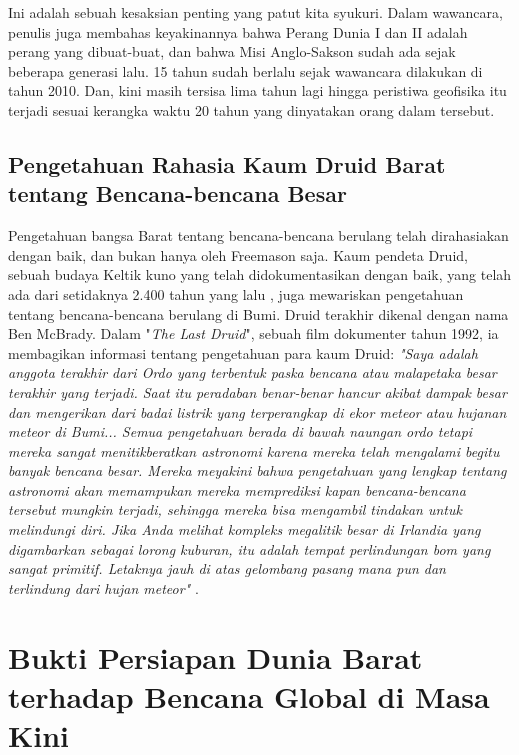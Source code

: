 \documentclass[10pt,twocolumn,letterpaper]{article}
\begin{document}
Ini adalah sebuah kesaksian penting yang patut kita syukuri. Dalam wawancara, penulis juga membahas keyakinannya bahwa Perang Dunia I dan II adalah perang yang dibuat-buat, dan bahwa Misi Anglo-Sakson sudah ada sejak beberapa generasi lalu. 15 tahun sudah berlalu sejak wawancara dilakukan di tahun 2010. Dan, kini masih tersisa lima tahun lagi hingga peristiwa geofisika itu terjadi sesuai kerangka waktu 20 tahun yang dinyatakan orang dalam tersebut.

\subsection{Pengetahuan Rahasia Kaum Druid Barat tentang Bencana-bencana Besar}

Pengetahuan bangsa Barat tentang bencana-bencana berulang telah dirahasiakan dengan baik, dan bukan hanya oleh Freemason saja. Kaum pendeta Druid, sebuah budaya Keltik kuno yang telah didokumentasikan dengan baik, yang telah ada dari setidaknya 2.400 tahun yang lalu \cite{7}, juga mewariskan pengetahuan tentang bencana-bencana berulang di Bumi. Druid terakhir dikenal dengan nama Ben McBrady. Dalam "\textit{The Last Druid}", sebuah film dokumenter tahun 1992, ia membagikan informasi tentang pengetahuan para kaum Druid: \textit{"Saya adalah anggota terakhir dari Ordo yang terbentuk paska bencana atau malapetaka besar terakhir yang terjadi. Saat itu peradaban benar-benar hancur akibat dampak besar dan mengerikan dari badai listrik yang terperangkap di ekor meteor atau hujanan meteor di Bumi... Semua pengetahuan berada di bawah naungan ordo tetapi mereka sangat menitikberatkan astronomi karena mereka telah mengalami begitu banyak bencana besar. Mereka meyakini bahwa pengetahuan yang lengkap tentang astronomi akan memampukan mereka memprediksi kapan bencana-bencana tersebut mungkin terjadi, sehingga mereka bisa mengambil tindakan untuk melindungi diri. Jika Anda melihat kompleks megalitik besar di Irlandia yang digambarkan sebagai lorong kuburan, itu adalah tempat perlindungan bom yang sangat primitif. Letaknya jauh di atas gelombang pasang mana pun dan terlindung dari hujan meteor"} \cite{8,9}.

\section{Bukti Persiapan Dunia Barat terhadap Bencana Global di Masa Kini}
\end{document}
